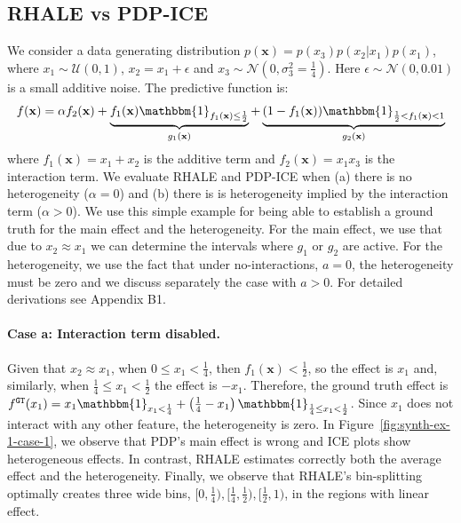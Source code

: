 \documentclass{ecai}  %
\newcommand{\xb}{\mathbf{x}}
\newcommand{\paragraphb}{\vspace{-0.25cm}\paragraph}
\begin{document}
\subsection{RHALE vs PDP-ICE}
\label{subsec:simulation-examples-1}

We consider a data generating distribution
\(p(\mathbf{x}) = p(x_3)p(x_2|x_1)p(x_1)\), where
\(x_1 \sim \mathcal{U}(0,1)\), \(x_2 = x_1 + \epsilon \) and
\(x_3 \sim \mathcal{N}\left(0, \sigma_3^2 = \frac{1}{4}\right)\). Here
$\epsilon \sim \mathcal{N}(0, 0.01)$ is a small additive noise.  The
predictive function is:
%
\begin{equation}
  \label{eq:synth-ex-1-function}
  f(\mathbf{x}) = \alpha f_2(\xb) + \underbrace{f_1(\xb) \mathbbm{1}_{f_1(\xb) \leq \frac{1}{2}}}_{g_1(\xb)} + \underbrace{(1 - f_1(\xb)) \mathbbm{1}_{\frac{1}{2} < f_1(\xb) < 1}}_{g_2(\xb)}
\end{equation}
%
where \(f_1(\mathbf{x}) = x_1 + x_2\) is the additive term and
\(f_2(\mathbf{x}) = x_1 x_3\) is the interaction term. We evaluate
RHALE and PDP-ICE when (a) there is no heterogeneity (\(\alpha=0\))
and (b) there is is heterogeneity implied by the interaction term
(\(\alpha > 0\)). We use this simple example for being able to
establish a ground truth for the main effect and the
heterogeneity. For the main effect, we use that due to
$x_2 \approx x_1$ we can determine the intervals where $g_1$ or $g_2$
are active. For the heterogeneity, we use the fact that under
no-interactions, \(a=0\), the heterogeneity must be zero and we
discuss separately the case with \(a>0\).  For detailed derivations
see Appendix B1.
%
\paragraphb{Case a: Interaction term disabled.}
Given that $x_2 \approx x_1$, when \( 0 \leq x_1 < \frac{1}{4}\), then
\(f_1(\xb) < \frac{1}{2}\), so the effect is $x_1$ and, similarly,
when $\frac{1}{4} \leq x_1 < \frac{1}{2}$ the effect is
$-x_1$. Therefore, the ground truth effect is
\(f^{\mathtt{GT}}(x_1) = x_1 \mathbbm{1}_{x_1 < \frac{1}{4}} +
\left(\frac{1}{4} - x_1\right) \mathbbm{1}_{\frac{1}{4} \leq x_1 <
  \frac{1}{2}}\).  Since \(x_1\) does not interact with any other
feature, the heterogeneity is zero.  In
Figure~\ref{fig:synth-ex-1-case-1}, we observe that PDP's main effect
is wrong and ICE plots show heterogeneous effects.  In contrast, RHALE
estimates correctly both the average effect and the heterogeneity.
Finally, we observe that RHALE's bin-splitting optimally creates three
wide bins,
\([0, \frac{1}{4}), [\frac{1}{4}, \frac{1}{2}), [\frac{1}{2}, 1)\), in
the regions with linear effect.
\end{document}
